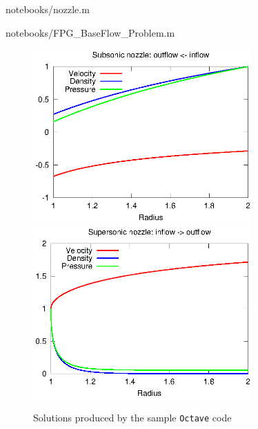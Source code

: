 \documentclass[letterpaper,11pt,nointlimits,reqno]{amsart}
\begin{document}

                {notebooks/nozzle.m}


                {notebooks/FPG_BaseFlow_Problem.m}

\begin{figure}
  \centering
  \includegraphics[width=0.75\textwidth]{nozzle_subsonic}
  \\
  \includegraphics[width=0.75\textwidth]{nozzle_supersonic}
  \caption{
      \label{fig:sample_solns}
      Solutions produced by the sample \texttt{Octave} code
  }
\end{figure}

\clearpage
\end{document}
